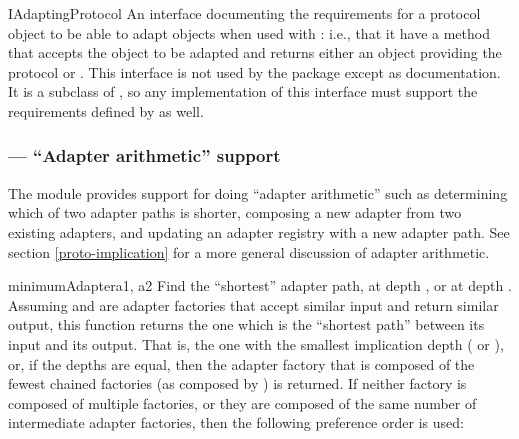 \begin{verbatim%
}
\begin{verbatim%
}
\begin{verbatim%
}
\begin{verbatim%
}
\begin{classdesc*}{IAdaptingProtocol}
An interface documenting the requirements for a protocol object to be able to
adapt objects when used with : i.e., that it have a
 method that accepts the object to be adapted and returns
either an object providing the protocol or .  This interface is
not used by the  package except as documentation.  It is a
subclass of , so any implementation of this interface must
support the requirements defined by  as well.
\end{classdesc*}
















\subsubsection{ --- ``Adapter arithmetic'' support \label{protocol-adapters-module}}

The  module provides support for doing ``adapter
arithmetic'' such as determining which of two adapter paths is shorter,
composing a new adapter from two existing adapters, and updating an adapter
registry with a new adapter path.  See section \ref{proto-implication} for a
more general discussion of adapter arithmetic.

\begin{funcdesc}{minimumAdapter}{a1, a2 }
Find the ``shortest'' adapter path,  at depth , or  at
depth .  Assuming  and  are adapter factories that
accept similar input and return similar output, this function returns the one
which is the ``shortest path'' between its input and its output.  That is, the
one with the smallest implication depth ( or ), or, if the
depths are equal, then the adapter factory that is composed of the fewest
chained factories (as composed by ) is returned.
If neither factory is composed of multiple factories, or they are composed of
the same number of intermediate adapter factories, then the following
preference order is used:


\end{funcdesc}
\end{verbatim%
}
\end{verbatim%
}
\end{verbatim%
}
\end{verbatim%
}
